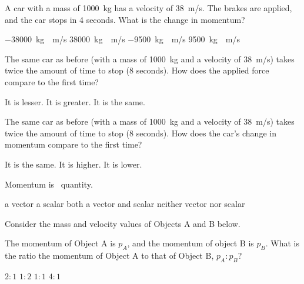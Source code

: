 \documentclass[../main-physics-problems.tex]{subfiles}
\begin{document}
\begin{questions}
\question
A car with a mass of \SI{1000}{kg} has a velocity of \SI{38}{m/s}. The brakes are applied, and the car stops in 4 seconds. What is the change in momentum?

\begin{randomizechoices}
    \correctchoice \SI[group-separator={,}]{-38000}{kg\cdot m/s}
    \choice \SI[group-separator={,}]{38000}{kg\cdot m/s}
    \choice \SI{-9500}{kg\cdot m/s}
    \choice \SI{9500}{kg\cdot m/s}
\end{randomizechoices}

\question
The same car as before (with a mass of \SI{1000}{kg} and a velocity of \SI{38}{m/s}) takes twice the amount of time to stop (8 seconds). How does the applied force compare to the first time? 

\begin{randomizechoices}
    \correctchoice It is lesser.
    \choice It is greater.
    \choice It is the same.
\end{randomizechoices}

\question
The same car as before (with a mass of \SI{1000}{kg} and a velocity of \SI{38}{m/s}) takes twice the amount of time to stop (8 seconds). How does the car’s change in momentum compare to the first time? 

\begin{randomizechoices}
    \correctchoice It is the same.
    \choice It is higher.
    \choice It is lower.
\end{randomizechoices}

\question
Momentum is \fillin[a vector][4cm]\ quantity.

\begin{randomizechoices}[norandomize]
    \correctchoice a vector
    \choice a scalar
    \choice both a vector and scalar
    \choice neither vector nor scalar
\end{randomizechoices}

\question
Consider the mass and velocity values of Objects A and B below.

\begin{center}
\end{center}

The momentum of Object A is $p_A$, and the momentum of object B is $p_B$. What is the ratio the momentum of Object A to that of Object B, $p_A : p_B$?

\begin{randomizechoices}
    \correctchoice $2:1$
    \choice $1:2$
    \choice $1:1$
    \choice $4:1$
\end{randomizechoices}
\end{questions}
\end{document}
